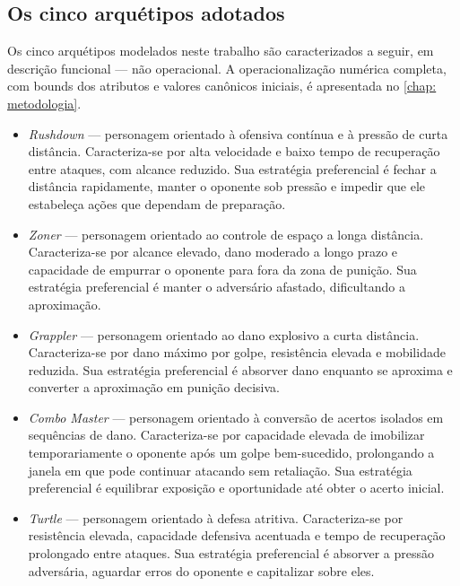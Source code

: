\subsection{Os cinco arquétipos adotados}

Os cinco arquétipos modelados neste trabalho são caracterizados a seguir, em descrição funcional --- não operacional. A operacionalização numérica completa, com bounds dos atributos e valores canônicos iniciais, é apresentada no \autoref{chap: metodologia}.

\begin{itemize}
    \item \textit{Rushdown} --- personagem orientado à ofensiva contínua e à pressão de curta distância. Caracteriza-se por alta velocidade e baixo tempo de recuperação entre ataques, com alcance reduzido. Sua estratégia preferencial é fechar a distância rapidamente, manter o oponente sob pressão e impedir que ele estabeleça ações que dependam de preparação.

    \item \textit{Zoner} --- personagem orientado ao controle de espaço a longa distância. Caracteriza-se por alcance elevado, dano moderado a longo prazo e capacidade de empurrar o oponente para fora da zona de punição. Sua estratégia preferencial é manter o adversário afastado, dificultando a aproximação.

    \item \textit{Grappler} --- personagem orientado ao dano explosivo a curta distância. Caracteriza-se por dano máximo por golpe, resistência elevada e mobilidade reduzida. Sua estratégia preferencial é absorver dano enquanto se aproxima e converter a aproximação em punição decisiva.

    \item \textit{Combo Master} --- personagem orientado à conversão de acertos isolados em sequências de dano. Caracteriza-se por capacidade elevada de imobilizar temporariamente o oponente após um golpe bem-sucedido, prolongando a janela em que pode continuar atacando sem retaliação. Sua estratégia preferencial é equilibrar exposição e oportunidade até obter o acerto inicial.

    \item \textit{Turtle} --- personagem orientado à defesa atritiva. Caracteriza-se por resistência elevada, capacidade defensiva acentuada e tempo de recuperação prolongado entre ataques. Sua estratégia preferencial é absorver a pressão adversária, aguardar erros do oponente e capitalizar sobre eles.
\end{itemize}

